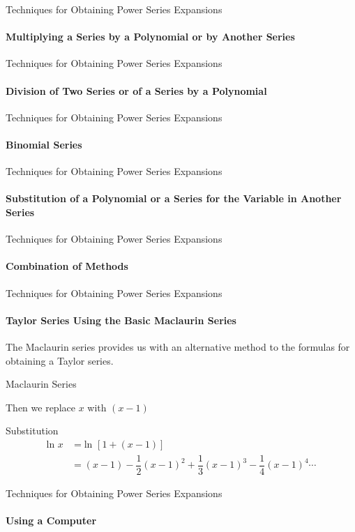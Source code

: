 \documentclass{beamer}
\begin{document}
\begin{frame}{Techniques for Obtaining Power Series Expansions}
    \framesubtitle{Multiplying a Series by a Polynomial or by Another Series}
\end{frame}
  
\begin{frame}{Techniques for Obtaining Power Series Expansions}
    \framesubtitle{Division of Two Series or of a Series by a Polynomial}
\end{frame}
  
\begin{frame}{Techniques for Obtaining Power Series Expansions}
    \framesubtitle{Binomial Series}
\end{frame}
  
\begin{frame}{Techniques for Obtaining Power Series Expansions}
    \framesubtitle{Substitution of a Polynomial or a Series for the Variable in Another Series}
\end{frame}
  
\begin{frame}{Techniques for Obtaining Power Series Expansions}
    \framesubtitle{Combination of Methods}
\end{frame}
  
\begin{frame}{Techniques for Obtaining Power Series Expansions}
    \framesubtitle{Taylor Series Using the Basic Maclaurin Series}
    The Maclaurin series provides us with an alternative method to the formulas for obtaining a Taylor series.
   \begin{exampleblock}{Maclaurin Series}
   \end{exampleblock}
   Then we replace $x$ with $(x-1)$
   \begin{exampleblock}{Substitution}
   	\begin{align*}
   	    \mbox{ln\ } x&= \mbox{ln\ } [1+(x-1)] \\
	    &= (x-1)-\dfrac{1}{2}(x-1)^2+\dfrac{1}{3}(x-1)^3-\dfrac{1}{4}(x-1)^4\cdots
	\end{align*}
   \end{exampleblock}
\end{frame}
  
\begin{frame}{Techniques for Obtaining Power Series Expansions}
    \framesubtitle{Using a Computer}
\end{frame}
  
\end{document}
